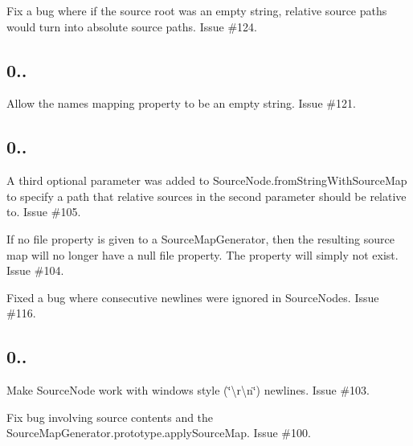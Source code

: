 \begin{DoxyItemize}
\item Fix a bug where if the source root was an empty string, relative source paths would turn into absolute source paths. Issue \#124.
\end{DoxyItemize}

\subsection*{0..}


\begin{DoxyItemize}
\item Allow the {\ttfamily names} mapping property to be an empty string. Issue \#121.
\end{DoxyItemize}

\subsection*{0..}


\begin{DoxyItemize}
\item A third optional parameter was added to {\ttfamily Source\+Node.\+from\+String\+With\+Source\+Map} to specify a path that relative sources in the second parameter should be relative to. Issue \#105.
\item If no file property is given to a {\ttfamily Source\+Map\+Generator}, then the resulting source map will no longer have a {\ttfamily null} file property. The property will simply not exist. Issue \#104.
\item Fixed a bug where consecutive newlines were ignored in {\ttfamily Source\+Node}s. Issue \#116.
\end{DoxyItemize}

\subsection*{0..}


\begin{DoxyItemize}
\item Make {\ttfamily Source\+Node} work with windows style (\char`\"{}\textbackslash{}r\textbackslash{}n\char`\"{}) newlines. Issue \#103.
\item Fix bug involving source contents and the {\ttfamily Source\+Map\+Generator.\+prototype.\+apply\+Source\+Map}. Issue \#100.
\end{DoxyItemize}


